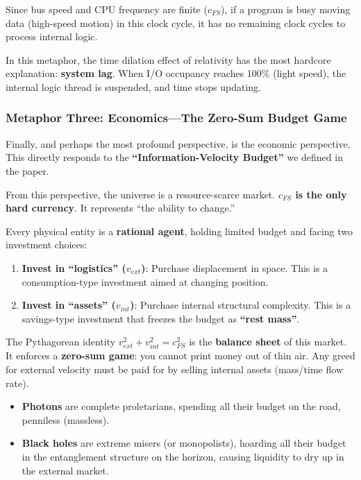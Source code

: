 Since bus speed and CPU frequency are finite ($c_{FS}$), if a program is busy moving data (high-speed motion) in this clock cycle, it has no remaining clock cycles to process internal logic.

In this metaphor, the time dilation effect of relativity has the most hardcore explanation: \textbf{system lag}. When I/O occupancy reaches 100\% (light speed), the internal logic thread is suspended, and time stops updating.

\subsubsection{Metaphor Three: Economics---The Zero-Sum Budget Game}

Finally, and perhaps the most profound perspective, is the economic perspective. This directly responds to the \textbf{``Information-Velocity Budget''} we defined in the paper.

From this perspective, the universe is a resource-scarce market. \textbf{$c_{FS}$ is the only hard currency}. It represents ``the ability to change.''

Every physical entity is a \textbf{rational agent}, holding limited budget and facing two investment choices:

\begin{enumerate}
\item \textbf{Invest in ``logistics'' ($v_{ext}$)}: Purchase displacement in space. This is a consumption-type investment aimed at changing position.

\item \textbf{Invest in ``assets'' ($v_{int}$)}: Purchase internal structural complexity. This is a savings-type investment that freezes the budget as \textbf{``rest mass''}.
\end{enumerate}

The Pythagorean identity $v_{ext}^2 + v_{int}^2 = c_{FS}^2$ is the \textbf{balance sheet} of this market. It enforces a \textbf{zero-sum game}: you cannot print money out of thin air. Any greed for external velocity must be paid for by selling internal assets (mass/time flow rate).

\begin{itemize}
\item \textbf{Photons} are complete proletarians, spending all their budget on the road, penniless (massless).

\item \textbf{Black holes} are extreme misers (or monopolists), hoarding all their budget in the entanglement structure on the horizon, causing liquidity to dry up in the external market.
\end{itemize}

